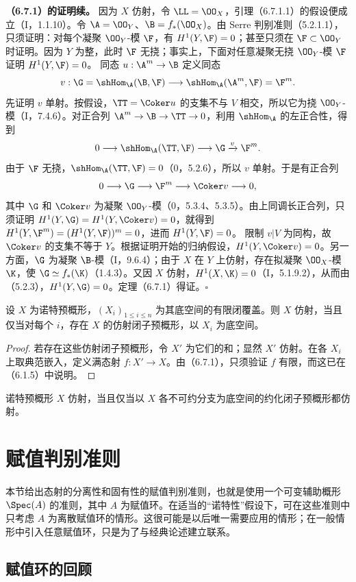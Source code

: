 \noindent\textbf{（6.7.1）的证明续。}
因为 $X$ 仿射，令 $\LL=\OO_X$，引理（6.7.1.1）的假设便成立（I，1.1.10）。令 $\A=\OO_Y$、$\B=f_*(\OO_X)$。由 Serre 判别准则（5.2.1.1），只须证明：对每个凝聚 $\OO_Y$-模 $\F$，有 $H^1(Y,\F)=0$；甚至只须在 $\F\subset\OO_Y$ 时证明。因为 $Y$ 为整，此时 $\F$ 无挠；事实上，下面对任意凝聚无挠 $\OO_Y$-模 $\F$ 证明 $H^1(Y,\F)=0$。
同态 $u:\A^m\to\B$ 定义同态
\[
v:\G=\shHom_\A(\B,\F)\longrightarrow
\shHom_\A(\A^m,\F)=\F^m.
\]
先证明 $v$ 单射。按假设，$\TT=\Coker u$ 的支集不与 $V$ 相交，所以它为挠 $\OO_Y$-模（I，7.4.6）。对正合列 $\A^m\to\B\to\TT\to0$，利用 $\shHom_\A$ 的左正合性，得到
\[
0\longrightarrow\shHom_\A(\TT,\F)\longrightarrow\G
\xrightarrow{v}\F^m.
\]
由于 $\F$ 无挠，$\shHom_\A(\TT,\F)=0$（0，5.2.6），所以 $v$ 单射。于是有正合列
\[
0\longrightarrow\G\longrightarrow\F^m\longrightarrow\Coker v\longrightarrow0,
\]
其中 $\G$ 和 $\Coker v$ 为凝聚 $\OO_Y$-模（0，5.3.4、5.3.5）。由上同调长正合列，只须证明
$H^1(Y,\G)=H^1(Y,\Coker v)=0$，就得到
$H^1(Y,\F^m)=(H^1(Y,\F))^m=0$，进而 $H^1(Y,\F)=0$。
限制 $v|V$ 为同构，故 $\Coker v$ 的支集不等于 $Y$。根据证明开始的归纳假设，$H^1(Y,\Coker v)=0$。另一方面，$\G$ 为凝聚 $\B$-模（I，9.6.4）；由于 $X$ 在 $Y$ 上仿射，存在拟凝聚 $\OO_X$-模 $\K$，使 $\G\simeq f_*(\K)$（1.4.3）。又因 $X$ 仿射，$H^1(X,\K)=0$（I，5.1.9.2），从而由（5.2.3），$H^1(Y,\G)=0$。定理（6.7.1）得证。\hfill$\square$

设 $X$ 为诺特预概形，$(X_i)_{1\leq i\leq n}$ 为其底空间的有限闭覆盖。则 $X$ 仿射，当且仅当对每个 $i$，存在 $X$ 的仿射闭子预概形，以 $X_i$ 为底空间。
\begin{proof}
若存在这些仿射闭子预概形，令 $X'$ 为它们的和；显然 $X'$ 仿射。在各 $X_i$ 上取典范嵌入，定义满态射 $f:X'\to X$。由（6.7.1），只须验证 $f$ 有限，而这已在（6.1.5）中说明。
\end{proof}

诺特预概形 $X$ 仿射，当且仅当以 $X$ 各不可约分支为底空间的约化闭子预概形都仿射。

\section{赋值判别准则}
本节给出态射的分离性和固有性的赋值判别准则，也就是使用一个可变辅助概形 $\Spec(A)$ 的准则，其中 $A$ 为赋值环。在适当的“诺特性”假设下，可在这些准则中只考虑 $A$ 为离散赋值环的情形。这很可能是以后唯一需要应用的情形；在一般情形中引入任意赋值环，只是为了与经典论述建立联系。

\subsection{赋值环的回顾}

